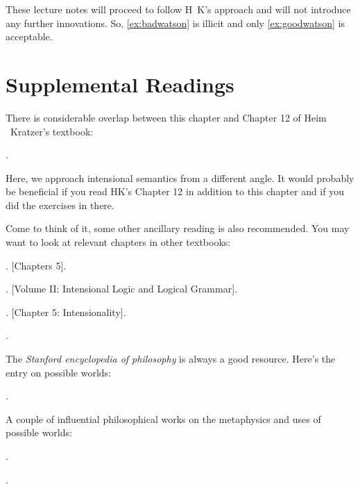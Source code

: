 These lecture notes will proceed to follow H\amp\ K's approach and will not
introduce any further innovations. So, \ref{ex:badwatson} is illicit and only
\ref{ex:goodwatson} is acceptable.
\section{Supplemental Readings}

{\setlength{\parindent}{0pt}\nonzeroparskip

  There is considerable overlap between this chapter and Chapter 12 of
  Heim \amp\ Kratzer's textbook:
\begin{bibentrylist}
	\item {}. 
\end{bibentrylist}

Here, we approach intensional semantics from a different angle. It
would probably be beneficial if you read H\amp K's Chapter 12 in
addition to this chapter and if you did the exercises in there.

Come to think of it, some other ancillary reading is also recommended.
You may want to look at relevant chapters in other textbooks:
\begin{bibentrylist}
	\item {}. [Chapters 5]. 
	\item {}. [Volume II: Intensional Logic and Logical Grammar]. 
	\item
          .
          [Chapter 5: Intensionality]. 
        \item {}.
\end{bibentrylist}

The \emph{Stanford encyclopedia of philosophy} is always a good resource. Here's
the entry on possible worlds:
\begin{bibentrylist}
	\item {}. 
\end{bibentrylist}

A couple of influential philosophical works on the metaphysics and
uses of possible worlds:
\begin{bibentrylist}
	\item {}. 
	\item {}. 
\end{bibentrylist}

}
